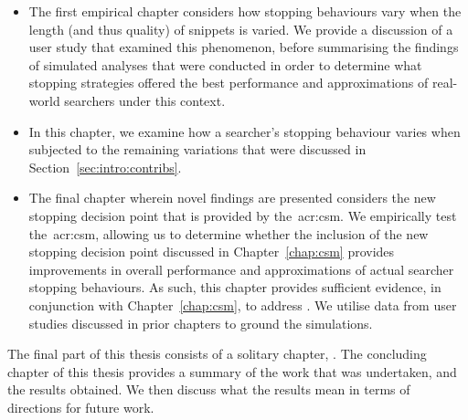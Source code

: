\begin{itemize}
    \item[]{ The first empirical chapter considers how stopping behaviours vary when the length (and thus quality) of snippets is varied. We provide a discussion of a user study that examined this phenomenon, before summarising the findings of simulated analyses that were conducted in order to determine what stopping strategies offered the best performance and approximations of real-world searchers under this context.}
    
    \item[]{ In this chapter, we examine how a searcher's stopping behaviour varies when subjected to the remaining variations that were discussed in Section~\ref{sec:intro:contribs}.}
    
    \item[]{ The final chapter wherein novel findings are presented considers the new stopping decision point that is provided by the~\gls{acr:csm}. We empirically test the~\gls{acr:csm}, allowing us to determine whether the inclusion of the new stopping decision point discussed in Chapter~\ref{chap:csm} provides improvements in overall performance and approximations of actual searcher stopping behaviours. As such, this chapter provides sufficient evidence, in conjunction with Chapter~\ref{chap:csm}, to address . We utilise data from user studies discussed in prior chapters to ground the simulations.}
\end{itemize}

\noindent
{} The final part of this thesis consists of a solitary chapter, . The concluding chapter of this thesis provides a summary of the work that was undertaken, and the results obtained. We then discuss what the results mean in terms of directions for future work.